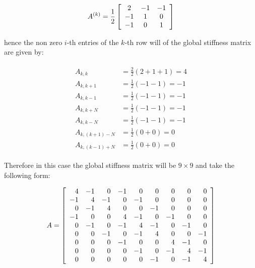 \begin{equation}
    A^{(k)} = \frac{1}{2}\left[\begin{array}{c c c}
            2 & -1 & -1 \\ -1 & 1 & 0 \\ -1 & 0 & 1
    \end{array}\right]
\end{equation}

hence the non zero $i$-th entries of the $k$-th row will of the global
stiffness matrix are given by:

\begin{align}\label{eq:twod-deterministic-global-stiffness}
  \begin{split}
    A_{k,k} &= \frac{2}{2}(2 + 1 + 1) = 4 \\
    A_{k,k+1} &= \frac{1}{2}(-1 -1) = -1 \\
    A_{k,k-1} &= \frac{1}{2}(-1 -1) = -1  \\
    A_{k,k+N} &= \frac{1}{2}(-1 -1) = -1 \\
    A_{k,k-N} &= \frac{1}{2}(-1 -1) = -1 \\
    A_{k,(k+1)-N} &= \frac{1}{2}(0 + 0) = 0 \\
    A_{k,(k-1)+N} &= \frac{1}{2}(0 + 0) = 0
  \end{split}
\end{align}

Therefore in this case the global stiffness matrix will be
$9 \times 9$ and take the following form:

\begin{equation}
    A = \left[\begin{array}{r r r r r r r r r}
        4 & -1 &  0 & -1 &  0 &  0 &  0 &  0 &  0 \\
       -1 &  4 & -1 &  0 & -1 &  0 &  0 &  0 &  0 \\
        0 & -1 &  4 &  0 &  0 & -1 &  0 &  0 &  0 \\
       -1 &  0 &  0 &  4 & -1 &  0 & -1 &  0 &  0 \\
        0 & -1 &  0 & -1 &  4 & -1 &  0 & -1 &  0 \\
        0 &  0 & -1 &  0 & -1 &  4 &  0 &  0 & -1 \\
        0 &  0 &  0 & -1 &  0 &  0 &  4 & -1 &  0 \\
        0 &  0 &  0 &  0 & -1 &  0 & -1 &  4 & -1 \\
        0 &  0 &  0 &  0 &  0 & -1 &  0 & -1 & 4
    \end{array}\right]
\end{equation}

